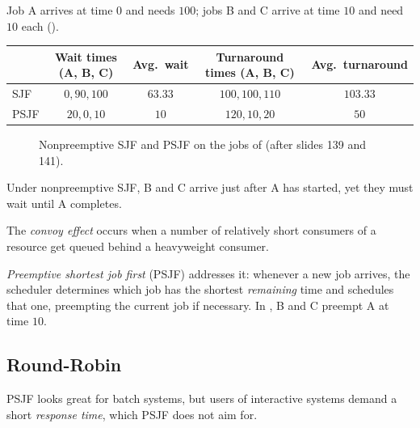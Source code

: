 \begin{example}
  \label{ex:sjf}
  Job A arrives at time $0$ and needs $100$; jobs B and C arrive at time $10$ and need $10$ each ().
  \begin{center}
  \begin{tabular}{lcccc}
    \toprule
     & Wait times (A, B, C) & Avg.\ wait & Turnaround times (A, B, C) & Avg.\ turnaround \\
    \midrule
    SJF & $0, 90, 100$ & $63.33$ & $100, 100, 110$ & $103.33$ \\
    PSJF & $20, 0, 10$ & $10$ & $120, 10, 20$ & $50$ \\
    \bottomrule
  \end{tabular}
  \end{center}
\end{example}

\begin{figure}[htbp]
\centering
{}
\caption{Nonpreemptive SJF and PSJF on the jobs of  (after slides 139 and 141).}
\label{fig:sjf}
\end{figure}

Under nonpreemptive SJF, B and C arrive just after A has started, yet they must wait until A completes.

\begin{definition}
  The \emph{convoy effect} occurs when a number of relatively short consumers of a resource get queued behind a heavyweight consumer.
\end{definition}

\emph{Preemptive shortest job first} (PSJF) addresses it: whenever a new job arrives, the scheduler determines which job has the shortest \emph{remaining} time and schedules that one, preempting the current job if necessary. In , B and C preempt A at time $10$.

\subsection{Round-Robin}

PSJF looks great for batch systems, but users of interactive systems demand a short \emph{response time}, which PSJF does not aim for.

